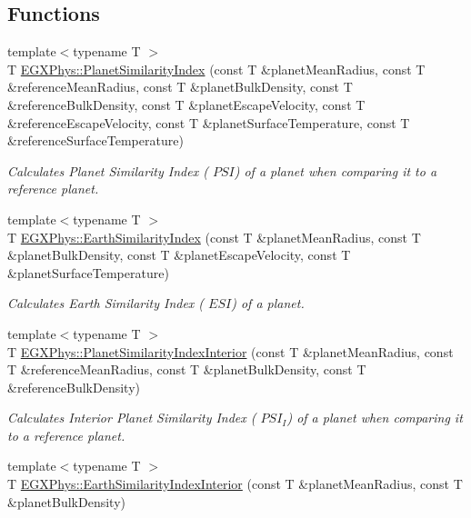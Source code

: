 \subsection*{Functions}
\begin{DoxyCompactItemize}
\item 
{\footnotesize template$<$typename T $>$ }\\T \hyperlink{group___astrophysics_ga62e8b781c301df60bd04af3183a965eb}{E\+G\+X\+Phys\+::\+Planet\+Similarity\+Index} (const T \&planet\+Mean\+Radius, const T \&reference\+Mean\+Radius, const T \&planet\+Bulk\+Density, const T \&reference\+Bulk\+Density, const T \&planet\+Escape\+Velocity, const T \&reference\+Escape\+Velocity, const T \&planet\+Surface\+Temperature, const T \&reference\+Surface\+Temperature)
\begin{DoxyCompactList}\small\item\em Calculates Planet Similarity Index ( $PSI$) of a planet when comparing it to a reference planet. \end{DoxyCompactList}\item 
{\footnotesize template$<$typename T $>$ }\\T \hyperlink{group___astrophysics_ga4b86397b1c839c49ac599d49fda207d4}{E\+G\+X\+Phys\+::\+Earth\+Similarity\+Index} (const T \&planet\+Mean\+Radius, const T \&planet\+Bulk\+Density, const T \&planet\+Escape\+Velocity, const T \&planet\+Surface\+Temperature)
\begin{DoxyCompactList}\small\item\em Calculates Earth Similarity Index ( $ESI$) of a planet. \end{DoxyCompactList}\item 
{\footnotesize template$<$typename T $>$ }\\T \hyperlink{group___astrophysics_ga6dc06a1a8baf6e132abed51fcf410c7f}{E\+G\+X\+Phys\+::\+Planet\+Similarity\+Index\+Interior} (const T \&planet\+Mean\+Radius, const T \&reference\+Mean\+Radius, const T \&planet\+Bulk\+Density, const T \&reference\+Bulk\+Density)
\begin{DoxyCompactList}\small\item\em Calculates Interior Planet Similarity Index ( $PSI_I$) of a planet when comparing it to a reference planet. \end{DoxyCompactList}\item 
{\footnotesize template$<$typename T $>$ }\\T \hyperlink{group___astrophysics_ga699bcc2f17b8855eaa856595d8032f61}{E\+G\+X\+Phys\+::\+Earth\+Similarity\+Index\+Interior} (const T \&planet\+Mean\+Radius, const T \&planet\+Bulk\+Density)

\end{DoxyCompactItemize}
